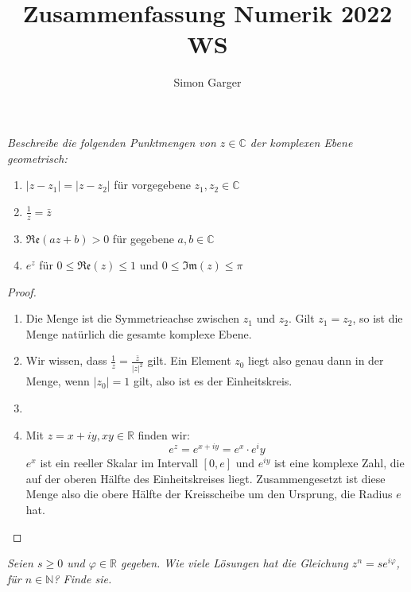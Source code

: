 \documentclass[11pt]{article}
\title{Zusammenfassung Numerik 2022 WS}
\author{Simon Garger}
\newcommand{\N}{\mathbb{N}}
\newcommand{\R}{\mathbb{R}}
\newcommand{\C}{\mathbb{C}}
\renewcommand{\Re}{\mathfrak{Re}}
\renewcommand{\Im}{\mathfrak{Im}}
\newenvironment{problem}[2][Beispiel]{
    \begin{trivlist}
        \item[\hskip \labelsep {\bfseries #1}\hskip \labelsep {\bfseries #2.}] \itshape}{
    \end{trivlist}\normalshape
}
\begin{document}
    \begin{problem}{1}
        Beschreibe die folgenden Punktmengen von $z\in \C$ der komplexen Ebene
        geometrisch:
        \begin{enumerate}[label=(\alph*)]
            \item $|z-z_1| = |z-z_2|$ für vorgegebene $z_1,z_2\in\C$
            \item $\frac{1}{z}=\bar{z}$
            \item $\Re(az+b)>0$ für gegebene $a,b\in\C$
            \item $e^z$ für $0\leq \Re(z)\leq 1$ und $0\leq \Im(z)\leq \pi$
        \end{enumerate}
    \end{problem}

    \begin{proof}
        \begin{enumerate}[label=(\alph*)]
            \item Die Menge ist die Symmetrieachse zwischen $z_1$ und $z_2$.
            Gilt $z_1=z_2$, so ist die Menge natürlich die gesamte komplexe Ebene.
            \item Wir wissen, dass $\frac{1}{z}=\frac{\bar{z}}{|z|^2}$ gilt.
            Ein Element $z_0$ liegt also genau dann in der Menge, wenn $|z_0|=1$ gilt,
            also ist es der Einheitskreis.
            \item
            \item Mit $z=x+iy,xy\in\R$ finden wir:
            $$e^z = e^{x+iy} = e^x\cdot e^iy$$
            $e^x$ ist ein reeller Skalar im Intervall $[0,e]$ und $e^{iy}$ ist
            eine komplexe Zahl, die auf der oberen Hälfte des Einheitskreises liegt.
            Zusammengesetzt ist diese Menge also die obere Hälfte der Kreisscheibe
            um den Ursprung, die Radius $e$ hat.
        \end{enumerate}
    \end{proof}

    \begin{problem}{2}
        Seien $s\geq 0$ und $\varphi\in\R$ gegeben. Wie viele Lösungen hat die
        Gleichung $z^n = se^{i\varphi}$, für $n\in \N$? Finde sie.
    \end{problem}
\end{document}
